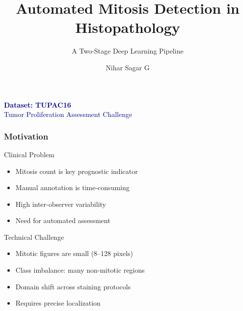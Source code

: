 \documentclass[aspectratio=169,13pt]{beamer}
\title{Automated Mitosis Detection in Histopathology}
\subtitle{A Two-Stage Deep Learning Pipeline}
\author{Nihar Sagar G}
\institute{6th Semester - NNDL Course Project}
\begin{document}
\begin{frame}[plain]
  \titlepage
  \vspace{-0.8cm}
  \textcolor{DarkBlue}{\textbf{\large Dataset: TUPAC16}} \\
  \textcolor{DarkBlue}{\small Tumor Proliferation Assessment Challenge}
\end{frame}

\begin{frame}
  \frametitle{Motivation}
            \begin{block}{Clinical Problem}
        \begin{itemize}
          \item Mitosis count is key prognostic indicator
          \item Manual annotation is time-consuming
          \item High inter-observer variability
          \item Need for automated assessment
        \end{itemize}
      \end{block}
    
          \begin{block}{Technical Challenge}
        \begin{itemize}
          \item Mitotic figures are small (8--128 pixels)
          \item Class imbalance: many non-mitotic regions
          \item Domain shift across staining protocols
          \item Requires precise localization
        \end{itemize}
      \end{block}
  
\end{frame}
\end{document}
